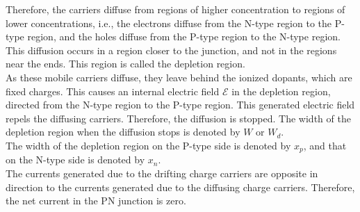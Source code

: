 \documentclass[titlepage, fleqn, a4paper, 12pt, twoside]{article}
\theoremstyle{definition}
\theoremstyle{theorem}
\begin{document}
Therefore, the carriers diffuse from regions of higher concentration to regions of lower concentrations, i.e., the electrons diffuse from the N-type region to the P-type region, and the holes diffuse from the P-type region to the N-type region.\\
This diffusion occurs in a region closer to the junction, and not in the regions near the ends.
This region is called the depletion region.\\
As these mobile carriers diffuse, they leave behind the ionized dopants, which are fixed charges.
This causes an internal electric field $\mathcal{E}$ in the depletion region, directed from the N-type region to the P-type region.
This generated electric field repels the diffusing carriers.
Therefore, the diffusion is stopped.
The width of the depletion region when the diffusion stops is denoted by $W$ or $W_d$.\\
The width of the depletion region on the P-type side is denoted by $x_p$, and that on the N-type side is denoted by $x_n$.
~\\
The currents generated due to the drifting charge carriers are opposite in direction to the currents generated due to the diffusing charge carriers.
Therefore, the net current in the PN junction is zero.\\
\end{document}
